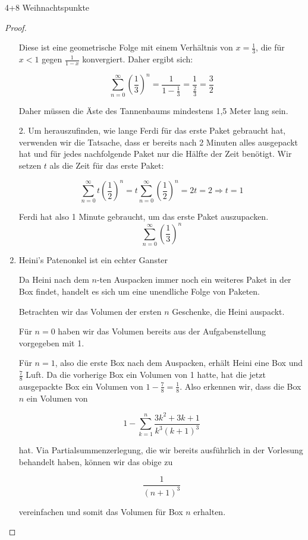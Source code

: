 \documentclass{problemset}
\begin{document}
\begin{problem}[Weihnachtsaufgaben*]{4+8 Weihnachtspunkte}
\begin{proof}
\begin{enumerate}
		      Diese ist eine geometrische Folge mit einem Verhältnis von \(x = \frac{1}{3}\),
		      die für \(x < 1\) gegen \(\frac{1}{1 - x}\) konvergiert. Daher ergibt sich:

		      \[
			      \sum_{n=0}^{\infty} {\left(\frac{1}{3}\right)}^n = \frac{1}{1 - \frac{1}{3}} = \frac{1}{\frac{2}{3}} = \frac{3}{2}
		      \]

		      Daher müssen die Äste des Tannenbaums mindestens 1,5 Meter lang sein.

		      2. Um herauszufinden, wie lange Ferdi für das erste Paket gebraucht hat, verwenden wir die Tatsache, dass er bereits nach 2 Minuten alles ausgepackt hat und für jedes nachfolgende Paket nur die Hälfte der Zeit benötigt.
		      Wir setzen $t$ als die Zeit für das erste Paket:

		      \[
			      \sum_{n=0}^{\infty} t {\left(\frac{1}{2}\right)}^n = t \sum_{n=0}^{\infty} {\left(\frac{1}{2}\right)}^n = 2t = 2 \Rightarrow t = 1
		      \]

		      Ferdi hat also 1 Minute gebraucht, um das erste Paket auszupacken.
		      \[
			      \sum_{n=0}^{\infty} {\left(\frac{1}{3}\right)}^n
		      \]

		\item Heini's Patenonkel ist ein echter Ganster

		      Da Heini nach dem $n$-ten Auspacken immer noch ein weiteres Paket in der Box
		      findet, handelt es sich um eine unendliche Folge von Paketen.

		      Betrachten wir das Volumen der ersten $n$ Geschenke, die Heini auspackt.

		      Für $n = 0$ haben wir das Volumen bereits aus der Aufgabenstellung vorgegeben
		      mit 1.

		      Für $n = 1$, also die erste Box nach dem Auspacken, erhält Heini eine Box und
		      $\frac{7}{8}$ Luft. Da die vorherige Box ein Volumen von 1 hatte, hat die jetzt
		      ausgepackte Box ein Volumen von $1 - \frac{7}{8} = \frac{1}{8}$. Also erkennen
		      wir, dass die Box $n$ ein Volumen von

		      \[
			      1 - \sum_{k=1}^n \frac{3k^2 + 3k + 1}{k^3{(k+1)}^3}
		      \]

		      hat. Via Partialsummenzerlegung, die wir bereits ausführlich in der Vorlesung
		      behandelt haben, können wir das obige zu

		      \[
			      \frac{1}{{(n+1)}^3}
		      \]

		      vereinfachen und somit das Volumen für Box $n$ erhalten.


\end{enumerate}
\end{proof}
\end{problem}
\end{document}
